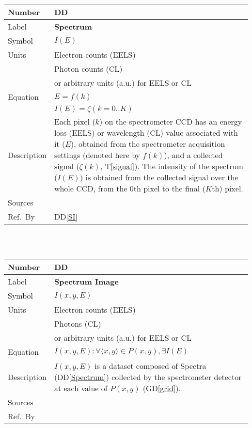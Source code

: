 \documentclass[12pt]{article}
\newcommand{\colAwidth}{0.13\textwidth}
\newcommand{\colBwidth}{0.82\textwidth}
\newcounter{defnum} %
\newcommand{\dref}[1]{GD\ref{#1}}
\newcounter{datadefnum} %
\newcommand{\ddref}[1]{DD\ref{#1}}
\newcommand{\tref}[1]{T\ref{#1}}
\begin{document}
\noindent
\begin{minipage}{\textwidth}
	\renewcommand*{\arraystretch}{1.5}
	\begin{tabular}{| p{\colAwidth} | p{\colBwidth}|}
		\hline
		\rowcolor[gray]{0.9}
		Number& DD{datadefnum}\thedatadefnum \label{Spectrum}\\
		\hline
		Label& \bf Spectrum\\
		\hline
		Symbol & $I(E)$\\
		\hline
		Units & Electron counts (EELS)\\
		& Photon counts (CL)\\
		& or arbitrary units (a.u.) for EELS or CL\\
		  \hline
		  Equation & $E = f(k)$\\
		  & $I(E) = \zeta(k=0..K)$\\
		  \hline
		  Description & Each pixel ($k$) on the spectrometer CCD has an energy loss (EELS) or wavelength (CL) value associated with it ($E$), obtained from the spectrometer acquisition settings (denoted here by $f(k)$), and a collected signal ($\zeta(k)$, \tref{signal}). The intensity of the spectrum ($I(E)$) is obtained from the collected signal over the whole CCD, from the 0th pixel to the final ($K$th) pixel.\\
		  \hline
		  Sources & \cite{egerton_introduction_2011} \\
		  \hline
		  Ref.\ By & \ddref{SI}\\
		  \hline
	\end{tabular}
\end{minipage}\\

~\newline

\noindent
\begin{minipage}{\textwidth}
\renewcommand*{\arraystretch}{1.5}
\begin{tabular}{| p{\colAwidth} | p{\colBwidth}|}
	\hline
	\rowcolor[gray]{0.9}
	Number& DD{datadefnum}\thedatadefnum \label{SI}\\
	\hline
	Label& \bf Spectrum Image\\
	\hline
	Symbol &$I(x, y, E)$\\
	\hline
	Units & Electron counts (EELS)\\
	& Photons (CL)\\
	& or arbitrary units (a.u.) for EELS or CL\\
	\hline
	Equation& $I(x, y, E): \forall \langle x, y \rangle \in P(x,y), \exists I(E)$ \\
	\hline
	Description & $I(x, y, E)$ is a dataset composed of Spectra (\ddref{Spectrum}) collected by the spectrometer detector at each value of $P(x,y)$ (\dref{grid}).
	\\
	\hline
	Sources&~\cite{jeanguillaume_spectrum-image:_1989}  \\
	\hline
	Ref.\ By & \\
	\hline
\end{tabular}
\end{minipage}\\
\end{document}
